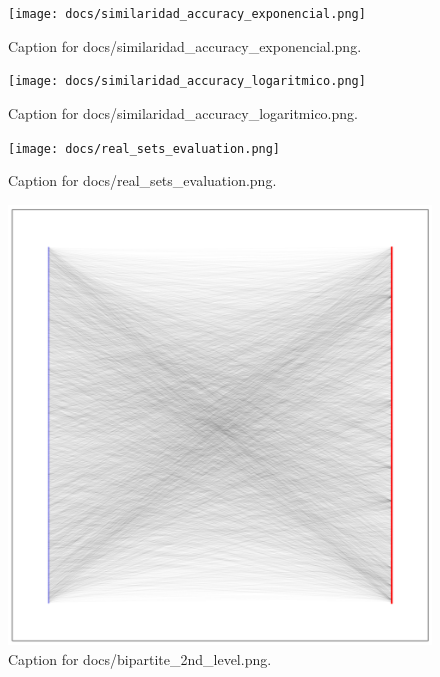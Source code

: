 \documentclass{article}
\begin{document}
\begin{figure}[h] \centering \texttt{[image: docs/similaridad\_accuracy\_exponencial.png]} \caption{Caption for docs/similaridad_accuracy_exponencial.png.} \end{figure}
\begin{figure}[h] \centering \texttt{[image: docs/similaridad\_accuracy\_logaritmico.png]} \caption{Caption for docs/similaridad_accuracy_logaritmico.png.} \end{figure}
\begin{figure}[h] \centering \texttt{[image: docs/real\_sets\_evaluation.png]} \caption{Caption for docs/real_sets_evaluation.png.} \end{figure}
\begin{figure}[h] \centering \includegraphics{docs/bipartite_2nd_level.png} \caption{Caption for docs/bipartite_2nd_level.png.} \end{figure}
\end{document}

